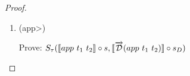 \documentclass[11pt, final]{article}
\begin{document}
\begin{proof}
\begin{enumerate}
\begin{itemize}
          Note that the \<var> term now denotates to ignoring the arbitrary unrelated type $\sigma$ and looking up $v$ in the rest of the list $\Gamma$.
          So $S_\tau(\llbracket var\ v \rrbracket \circ tl \circ s, \llbracket \D(var\ v) \rrbracket \circ tl \circ s_D)$, which is proven using the induction hypothesis by respectively instantiating $f$ and $g$ as $tl \circ s$ and $tl \circ s_D$.

          \begin{align*}
            S&_\tau(\llbracket var\ (Pop\ v) \rrbracket \circ s, \llbracket \D(var\ (Pop\ v)) \rrbracket \circ s_D) \\
            &\Vdash \text{(Definition of $\D$)} \\
            & S_\tau(\llbracket var\ (Pop\ v) \rrbracket \circ s, \llbracket var\ (Pop\ v) \rrbracket \circ s_D) \\
            &\Vdash \text{(Definition of $\circ$)} \\
            & S_\tau(\lambda x. \llbracket var\ (Pop\ v) \rrbracket (s(x)), \lambda x. \llbracket var\ (Pop\ v) \rrbracket (s_D(x))) \\
            &\Vdash \text{(Definition of $\llbracket\rrbracket$)} \\
            & S_\tau(\lambda x. lookup\ \llbracket Pop\ v \rrbracket (s(x)), \lambda x. lookup\ \llbracket Pop\ v \rrbracket (s_D(x))) \\
            &\Vdash \text{(Rewrite using $s = \lambda x. hd(s(x))::tl(s(x))$)} \\
            & S_\tau(\lambda x. lookup\ \llbracket Pop\ v \rrbracket (hd(s(x))::tl(s(x))), \\
              & \;\;\; \lambda x. lookup\ \llbracket Pop\ v \rrbracket (hd(s_D(x))::tl(s_D(x)))) \\
            & \Vdash \text{(Simplify with lookup and $\llbracket Pop\ v \rrbracket$)} \\
            & S_\tau(\lambda x. lookup\ \llbracket v \rrbracket (tl(s(x))), \lambda x. lookup\ \llbracket v \rrbracket (tl(s_D(x)))) \\
            & \Vdash \text{(Use IH. \ref{eqn:subst_ih_var_Pop} with $f = tl(s(x))$ and $g = tl(s_D(x))$)}
          \end{align*} \qed
        \end{itemize}
      \item (\<app>)

        Prove: $S_\tau(\llbracket app\ t_1\ t_2 \rrbracket \circ s, \llbracket \overrightarrow{\mathcal{D}}(app\ t_1\ t_2) \rrbracket \circ s_D)$


\end{enumerate}
\end{proof}
\end{document}
